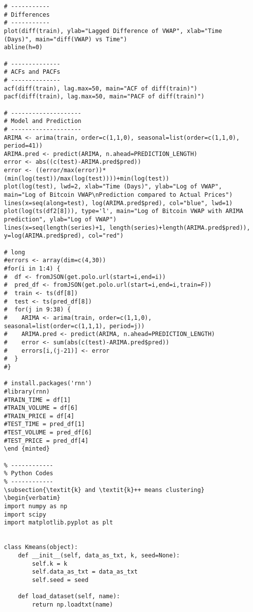 \begin{verbatim}
# -----------
# Differences
# -----------
plot(diff(train), ylab="Lagged Difference of VWAP", xlab="Time (Days)", main="diff(VWAP) vs Time")
abline(h=0)

# --------------
# ACFs and PACFs
# --------------
acf(diff(train), lag.max=50, main="ACF of diff(train)")
pacf(diff(train), lag.max=50, main="PACF of diff(train)")

# --------------------
# Model and Prediction
# --------------------
ARIMA <- arima(train, order=c(1,1,0), seasonal=list(order=c(1,1,0), period=41))
ARIMA.pred <- predict(ARIMA, n.ahead=PREDICTION_LENGTH)
error <- abs((c(test)-ARIMA.pred$pred))
error <- ((error/max(error))*(min(log(test))/max(log(test))))+min(log(test))
plot(log(test), lwd=2, xlab="Time (Days)", ylab="Log of VWAP", main="Log of Bitcoin VWAP\nPrediction compared to Actual Prices")
lines(x=seq(along=test), log(ARIMA.pred$pred), col="blue", lwd=1)
plot(log(ts(df2[8])), type='l', main="Log of Bitcoin VWAP with ARIMA prediction", ylab="Log of VWAP")
lines(x=seq(length(series)+1, length(series)+length(ARIMA.pred$pred)), y=log(ARIMA.pred$pred), col="red")

# long
#errors <- array(dim=c(4,30))
#for(i in 1:4) {
#  df <- fromJSON(get.polo.url(start=i,end=i))
#  pred_df <- fromJSON(get.polo.url(start=i,end=i,train=F))
#  train <- ts(df[8])
#  test <- ts(pred_df[8])
#  for(j in 9:38) {
#    ARIMA <- arima(train, order=c(1,1,0), seasonal=list(order=c(1,1,1), period=j))
#    ARIMA.pred <- predict(ARIMA, n.ahead=PREDICTION_LENGTH)
#    error <- sum(abs(c(test)-ARIMA.pred$pred))
#    errors[i,(j-21)] <- error
#  }
#}

# install.packages('rnn')
#library(rnn)
#TRAIN_TIME = df[1]
#TRAIN_VOLUME = df[6]
#TRAIN_PRICE = df[4]
#TEST_TIME = pred_df[1]
#TEST_VOLUME = pred_df[6]
#TEST_PRICE = pred_df[4]
\end {minted}

% ------------
% Python Codes
% ------------
\subsection{\textit{k} and \textit{k}++ means clustering}
\begin{verbatim}
import numpy as np
import scipy
import matplotlib.pyplot as plt


class Kmeans(object):
    def __init__(self, data_as_txt, k, seed=None):
        self.k = k
        self.data_as_txt = data_as_txt
        self.seed = seed

    def load_dataset(self, name):
        return np.loadtxt(name)


\end{verbatim}
